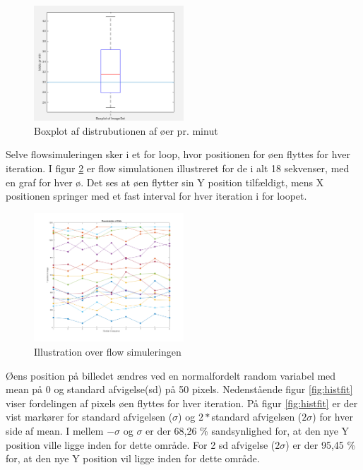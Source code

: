  \begin{figure}[H]
	\centering
	\includegraphics[width=0.5\textwidth]{billeder/software/boxplot.png}
	\caption{Boxplot af distrubutionen af øer pr. minut}
	\label{fig:boxplot}
\end{figure}

Selve flowsimuleringen sker i et for loop, hvor positionen for øen flyttes for hver iteration. I figur \ref{fig:flowsim} er flow simulationen illustreret for de i alt 18 sekvenser, med en graf for hver ø. Det ses at øen flytter sin Y position tilfældigt, mens X positionen springer med et fast interval for hver iteration i for loopet.

\begin{figure}[H]
	\centering
	\includegraphics[width=0.5\textwidth]{billeder/software/Simulation.png}
	\caption{Illustration over flow simuleringen}
	\label{fig:flowsim}
\end{figure}


Øens position på billedet ændres ved en normalfordelt random variabel med mean på 0 og standard afvigelse(sd) på 50 pixels. Nedenstående figur \ref{fig:histfit} viser fordelingen af pixels øen flyttes for hver iteration. På figur \ref{fig:histfit} er der vist markører for standard afvigelsen ($\sigma$) og $2*$standard afvigelsen ($2\sigma$) for hver side af mean. I mellem $-\sigma$ og $\sigma$ er der 68,26 \% sandsynlighed for, at den nye Y position ville ligge inden for dette område. For 2 sd afvigelse ($2\sigma$) er der 95,45 \% for, at den nye Y position vil ligge inden for dette område.

